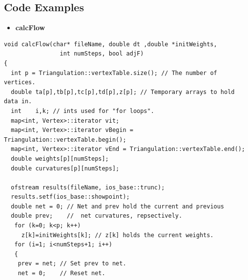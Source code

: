 \documentclass[12pt]{article}
\begin{document}
\subsection{Code Examples}
\label{calcFlowCode}
\begin{itemize}
\item \textbf{calcFlow}
\end{itemize}
\begin{verbatim}
void calcFlow(char* fileName, double dt ,double *initWeights,
				int numSteps, bool adjF)  
{
  int p = Triangulation::vertexTable.size(); // The number of vertices.
  double ta[p],tb[p],tc[p],td[p],z[p]; // Temporary arrays to hold data in.
  int    i,k; // ints used for "for loops".
  map<int, Vertex>::iterator vit;
  map<int, Vertex>::iterator vBegin = Triangulation::vertexTable.begin();
  map<int, Vertex>::iterator vEnd = Triangulation::vertexTable.end();
  double weights[p][numSteps];
  double curvatures[p][numSteps];
  
  ofstream results(fileName, ios_base::trunc);
  results.setf(ios_base::showpoint);
  double net = 0; // Net and prev hold the current and previous
  double prev;    //  net curvatures, repsectively.
   for (k=0; k<p; k++)
     z[k]=initWeights[k]; // z[k] holds the current weights.
   for (i=1; i<numSteps+1; i++) 
   {
    prev = net; // Set prev to net.
    net = 0;    // Reset net.
    

\end{verbatim}
\end{document}
